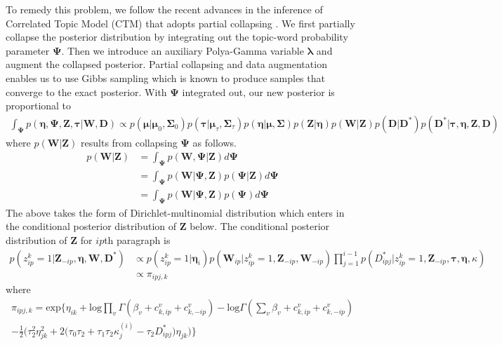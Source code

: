To remedy this problem, we follow the recent advances in the inference of Correlated Topic Model (CTM) that adopts partial collapsing \citep{held2006bayesian,chen2013scalable,linderman2015dependent}. We first partially collapse the posterior distribution by integrating out the topic-word probability parameter $\pmb\Psi$. Then we introduce an auxiliary Polya-Gamma variable $\pmb\lambda$ and augment the collapsed posterior. Partial collapsing and data augmentation enables us to use Gibbs sampling which is known to produce samples that converge to the exact posterior. With $\pmb\Psi$ integrated out, our new posterior is proportional to
{\small
\begin{align}
	\int_{\pmb\Psi}p(\pmb\eta,\pmb\Psi,\textbf{Z},\pmb\tau|\textbf{W},\textbf{D}) \propto p(\pmb\mu|\pmb\mu_0,\pmb\Sigma_0)p(\pmb\tau|\pmb\mu_{\tau},\pmb\Sigma_{\tau})p(\pmb\eta|\pmb\mu,\pmb\Sigma)p(\textbf{Z}|\pmb\eta)p(\textbf{W}|\textbf{Z})p(\textbf{D}|\textbf{D}^*)p(\textbf{D}^*|\pmb\tau,\pmb\eta,\textbf{Z},\textbf{D})
\end{align}
}
where $p(\textbf{W}|\textbf{Z})$ results from collapsing $\pmb\Psi$ as follows.
\begin{align}
	p(\textbf{W}|\textbf{Z}) &= \int_{\pmb\Psi} p(\textbf{W},\pmb\Psi|\textbf{Z})d\pmb\Psi \nonumber \\
	&= \int_{\pmb\Psi} p(\textbf{W}|\pmb\Psi,\textbf{Z})p(\pmb\Psi|\textbf{Z})d\pmb\Psi \nonumber \\
	&= \int_{\pmb\Psi} p(\textbf{W}|\pmb\Psi,\textbf{Z})p(\pmb\Psi)d\pmb\Psi
\end{align}
The above takes the form of Dirichlet-multinomial distribution which enters in the conditional posterior distribution of $\textbf{Z}$ below. The conditional posterior distribution of \textbf{Z} for $ip$th paragraph is 
{ \small
\begin{align}   
    p(z_{ip}^k=1|\mathbf{Z}_{-ip},\pmb\eta,\mathbf{W},\mathbf{D}^*) &\propto p(z_{ip}^k=1|\pmb\eta_i)p(\mathbf{W}_{ip}|z_{ip}^k=1,\mathbf{Z}_{-ip},\mathbf{W}_{-ip}) \prod_{j=1}^{i-1}p(D_{ipj}^*|z_{ip}^k=1,\textbf{Z}_{-ip},\pmb\tau,\pmb\eta,\kappa) \nonumber \\
    &\propto \pi_{ipj,k}
\end{align}
}
where 
{ \small
\begin{align}
	\pi_{ipj,k} = \text{exp}\Bigg\{  \eta_{ik} + \text{log}\prod_v \Gamma(\beta_v + c_{k,ip}^v + c_{k,-ip}^v) - \text{log}\Gamma(\sum_v \beta_v + c_{k,ip}^v + c_{k,-ip}^v) \nonumber \\
	- \frac{1}{2}\Big(\tau_2^2\eta_{jk}^2 + 2\big(\tau_0\tau_2 + \tau_1\tau_2\kappa_j^{(i)} - \tau_2 D_{ipj}^* \big)\eta_{jk} \Big) \Bigg\}
\end{align}
}

